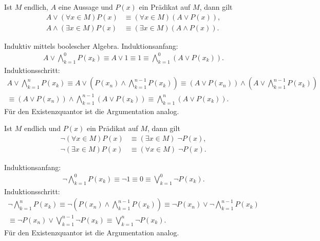 \begin{Satz}[Distributivgesetze]
Ist $M$ endlich, $A$ eine Aussage und $P(x)$ ein Prädikat auf $M$,
dann gilt
\begin{align*}
A\lor(\forall x\in M)P(x) &\equiv (\forall x\in M)(A\lor P(x)),\\
A\land(\exists x\in M)P(x) &\equiv (\exists x\in M)(A\land P(x)).
\end{align*}
\end{Satz}
 Induktiv mittels boolescher Algebra. Induktionsanfang:
\begin{gather*}
A\lor\bigwedge_{k=1}^0 P(x_k) \equiv A\lor 1 \equiv 1 \equiv \bigwedge_{k=1}^0 (A\lor P(x_k)).
\end{gather*}
Induktionsschritt:
\begin{gather*}
A\lor\bigwedge_{k=1}^n P(x_k) \equiv
A\lor (P(x_n)\land\bigwedge_{k=1}^{n-1} P(x_k))
\equiv (A\lor P(x_n))\land (A\lor\bigwedge_{k=1}^{n-1} P(x_k))\\
\equiv (A\lor P(x_n))\land \bigwedge_{k=1}^{n-1} (A\lor P(x_k))
\equiv \bigwedge_{k=1}^n (A\lor P(x_k)).
\end{gather*}
Für den Existenzquantor ist die Argumentation analog.\;\qedsymbol

\begin{Satz}
Ist $M$ endlich und $P(x)$ ein Prädikat auf $M$, dann gilt
\begin{align*}
\neg(\forall x\in M)P(x) &\equiv (\exists x\in M)\;\neg P(x),\\
\neg(\exists x\in M)P(x) &\equiv (\forall x\in M)\;\neg P(x).
\end{align*}
\end{Satz}
 Induktionsanfang:
\begin{gather*}
\neg\bigwedge_{k=1}^0 P(x_k) \equiv \neg 1 \equiv 0 \equiv\bigvee_{k=1}^0 \neg P(x_k).
\end{gather*}
Induktionsschritt:
\begin{gather*}
\neg\bigwedge_{k=1}^n P(x_k)
\equiv \neg(P(x_n)\land\bigwedge_{k=1}^{n-1} P(x_k))
\equiv \neg P(x_n)\lor\neg\bigwedge_{k=1}^{n-1} P(x_k)\\
\equiv \neg P(x_n)\lor\bigvee_{k=1}^{n-1} \neg P(x_k)
\equiv \bigvee_{k=1}^n \neg P(x_k).
\end{gather*}
Für den Existenzquantor ist die Argumentation analog.\;\qedsymbol

